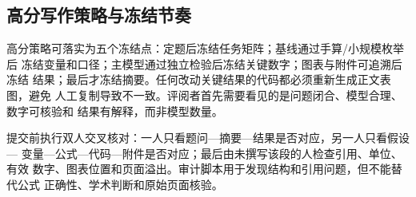 \subsection{高分写作策略与冻结节奏}

高分策略可落实为五个冻结点：定题后冻结任务矩阵；基线通过手算/小规模枚举后
冻结变量和口径；主模型通过独立检验后冻结关键数字；图表与附件可追溯后冻结
结果；最后才冻结摘要。任何改动关键结果的代码都必须重新生成正文表图，避免
人工复制导致不一致。评阅者首先需要看见的是问题闭合、模型合理、数字可核验和
结果有解释，而非模型数量。

提交前执行双人交叉核对：一人只看题问—摘要—结果是否对应，另一人只看假设—
变量—公式—代码—附件是否对应；最后由未撰写该段的人检查引用、单位、有效
数字、图表位置和页面溢出。审计脚本用于发现结构和引用问题，但不能替代公式
正确性、学术判断和原始页面核验。

